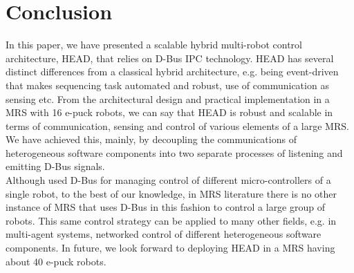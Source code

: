 \documentclass[draft]{ifacconf}
\begin{document}
\section{Conclusion}
\label{sec:conc}
In this paper, we have presented a scalable hybrid multi-robot control architecture, HEAD, that relies on D-Bus IPC technology. HEAD has several distinct differences from a classical hybrid architecture, e.g. being event-driven that makes sequencing task automated and robust, use of communication as sensing etc. From the architectural design and practical implementation in a MRS with 16 e-puck robots, we can say that HEAD is robust and scalable in terms of communication, sensing and control of various elements of a large MRS. We have achieved this, mainly, by decoupling the communications of heterogeneous software components into two separate processes of listening and emitting D-Bus signals.\\
Although \cite{Magnenat+2009} used D-Bus for managing control of different micro-controllers of a single robot, to the best of our knowledge, in MRS literature there is no other instance of MRS that uses D-Bus in this fashion to control a large group of robots. This same control strategy can be applied to many other fields, e.g. in multi-agent systems, networked control of different heterogeneous software components. In future, we look forward to deploying HEAD in a MRS having about 40 e-puck robots.
\end{document}
